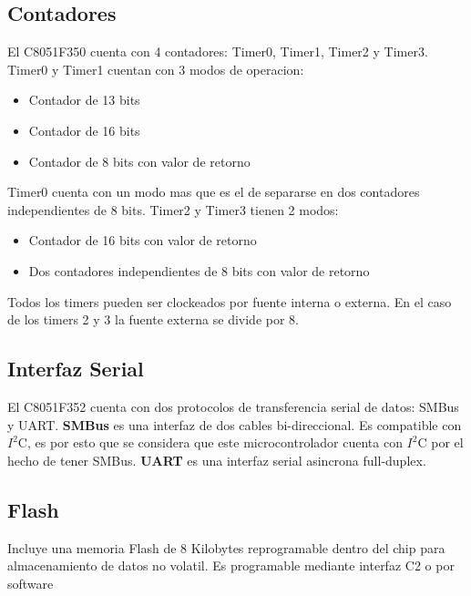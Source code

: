 \subsection{Contadores} %
\label{sub:contadores}

El C8051F350 cuenta con 4 contadores: Timer0, Timer1, Timer2 y Timer3. Timer0 y Timer1 cuentan con 3 modos de operacion:
\begin{itemize}
  \item Contador de 13 bits
  \item Contador de 16 bits
  \item Contador de 8 bits con valor de retorno
\end{itemize}
Timer0 cuenta con un modo mas que es el de separarse en dos contadores independientes de 8 bits.
Timer2 y Timer3 tienen 2 modos:
 \begin{itemize}
   \item Contador de 16 bits con valor de retorno
   \item Dos contadores independientes de 8 bits con valor de retorno
 \end{itemize}

Todos los timers pueden ser clockeados por fuente interna o externa. En el caso de los timers 2 y 3 la fuente externa se divide por 8.

\subsection{Interfaz Serial} %
\label{sub:interfaz_serial}

El C8051F352 cuenta con dos protocolos de transferencia serial de datos: SMBus y UART. \textbf{SMBus} es una interfaz de dos cables bi-direccional. Es compatible con $I^{2}$C, es por esto que se considera que este microcontrolador cuenta con $I^{2}$C por el hecho de tener SMBus. \textbf{UART} es una interfaz serial asincrona full-duplex.

\subsection{Flash} %
\label{sub:flash}

Incluye una memoria Flash de 8 Kilobytes reprogramable dentro del chip para almacenamiento de datos no volatil. Es programable mediante interfaz C2 o por software
